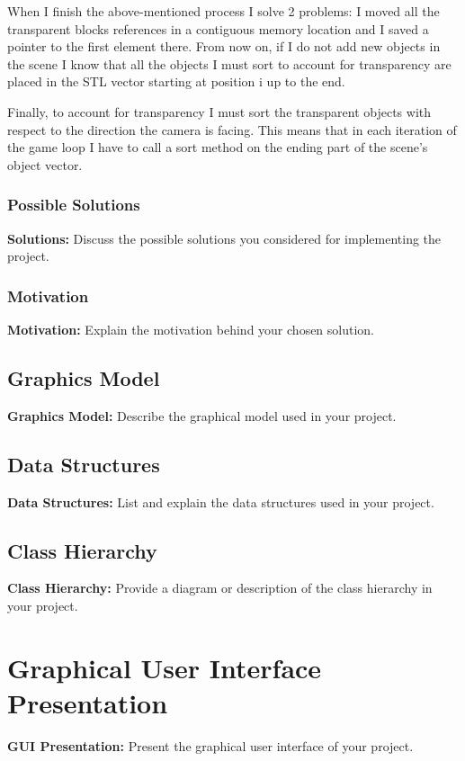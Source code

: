 \documentclass[12pt]{article}
\begin{document}
	When I finish the above-mentioned process I solve 2 problems: I moved all the transparent blocks references in a contiguous memory location and I saved a pointer to the first element there. From now on, if I do not add new objects in the scene I know that all the objects I must sort to account for transparency are placed in the STL vector starting at position i up to the end.
		
	Finally, to account for transparency I must sort the transparent objects with respect to the direction the camera is facing. This means that in each iteration of the game loop I have to call a sort method on the ending part of the scene's object vector.
		
	\subsubsection{Possible Solutions}
	\textbf{Solutions:} Discuss the possible solutions you considered for implementing the project.
	
	\subsubsection{Motivation}
	\textbf{Motivation:} Explain the motivation behind your chosen solution.
	
	\subsection{Graphics Model}
	\textbf{Graphics Model:} Describe the graphical model used in your project.
	
	\subsection{Data Structures}
	\textbf{Data Structures:} List and explain the data structures used in your project.
	
	\subsection{Class Hierarchy}
	\textbf{Class Hierarchy:} Provide a diagram or description of the class hierarchy in your project.
	
	\section{Graphical User Interface Presentation}
	\textbf{GUI Presentation:} Present the graphical user interface of your project.
	
\end{document}
